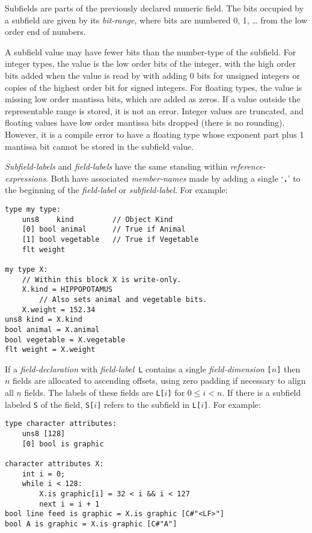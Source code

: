 \documentclass[12pt]{article}
\newcommand{\TT}[1]{{\tt \bfseries #1}}
\newenvironment{indpar}[1][0.3in]%
	{\begin{list}{}%
		     {\setlength{\itemsep}{0in}%
		      \setlength{\topsep}{0in}%
		      \setlength{\parsep}{1ex}%
		      \setlength{\labelwidth}{#1}%
		      \setlength{\leftmargin}{#1}%
		      \addtolength{\leftmargin}{\labelsep}}%
	 \item}%
	{\end{list}}
\begin{document}
Subfields are parts of the previously declared numeric field.
The bits occupied
by a subfield are given by its {\em bit-range}, where bits are numbered
0, 1, \ldots{} from the low order end of numbers.

A subfield value may have fewer bits than the number-type of the subfield.
For integer types, the value is the low order bits of the integer, with
the high order bits added when the value is read by with adding 0 bits
for unsigned integers or copies of the highest order bit for signed integers.
For floating types, the value is missing low order mantissa bits, which
are added as zeros.  If a value outside the representable range is stored,
it is not an error.  Integer values are truncated, and floating values
have low order mantissa bits dropped (there is no rounding).  However, it is
a compile error to have a floating type whose exponent part plus
1 mantissa bit cannot be stored in the subfield value.

{\em Subfield-labels} and {\em field-labels} have the same standing within
{\em reference-expressions}.
Both have associated {\em member-names} made by adding a single
`\TT{.}' to the beginning of the {\em field-label} or {\em subfield-label}.
For example:

\begin{indpar}\begin{verbatim}
type my type:
    uns8    kind         // Object Kind
    [0] bool animal      // True if Animal
    [1] bool vegetable   // True if Vegetable
    flt weight

my type X:
    // Within this block X is write-only.
    X.kind = HIPPOPOTAMUS
        // Also sets animal and vegetable bits.
    X.weight = 152.34
uns8 kind = X.kind
bool animal = X.animal
bool vegetable = X.vegetable
flt weight = X.weight
\end{verbatim}\end{indpar}

If a {\em field-declaration} with {\em field-label}\, {\tt L} contains 
a single {\em field-dimension} {\tt [$n$]} then $n$ fields are
allocated to ascending offsets, using zero padding
if necessary to align all $n$ fields.  The labels of these
fields are {\tt L[$i$]} for $0\le i<n$.  If there is a subfield
labeled {\tt S} of the field, {\tt S[$i$]} refers to the
subfield in {\tt L[$i$]}.  For example:

\begin{indpar}\begin{verbatim}
type character attributes:
    uns8 [128]
    [0] bool is graphic

character attributes X:
    int i = 0;
    while i < 128:
        X.is graphic[i] = 32 < i && i < 127
        next i = i + 1
bool line feed is graphic = X.is graphic [C#"<LF>"]
bool A is graphic = X.is graphic [C#"A"]
\end{verbatim}\end{indpar}
\end{document}

